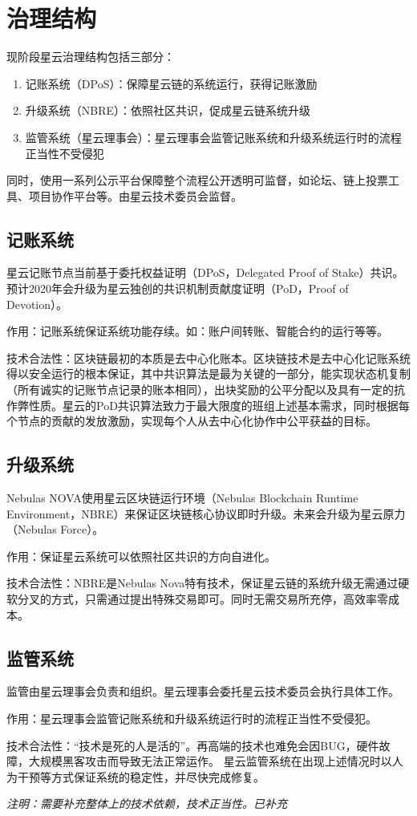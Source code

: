 \section{治理结构}
现阶段星云治理结构包括三部分：
\begin{enumerate}
	\item 记账系统（DPoS）：保障星云链的系统运行，获得记账激励
	\item 升级系统（NBRE）：依照社区共识，促成星云链系统升级
	\item 监管系统（星云理事会）：星云理事会监管记账系统和升级系统运行时的流程正当性不受侵犯
\end{enumerate}
同时，使用一系列公示平台保障整个流程公开透明可监督，如论坛、链上投票工具、项目协作平台等。由星云技术委员会监督。

\subsection{记账系统}
星云记账节点当前基于委托权益证明（DPoS，Delegated Proof of Stake）共识。预计2020年会升级为星云独创的共识机制贡献度证明（PoD，Proof of Devotion）。

作用：记账系统保证系统功能存续。如：账户间转账、智能合约的运行等等。

技术合法性：区块链最初的本质是去中心化账本。区块链技术是去中心化记账系统得以安全运行的根本保证，其中共识算法是最为关键的一部分，能实现状态机复制（所有诚实的记账节点记录的账本相同），出块奖励的公平分配以及具有一定的抗作弊性质。星云的PoD共识算法致力于最大限度的班组上述基本需求，同时根据每个节点的贡献的发放激励，实现每个人从去中心化协作中公平获益的目标。

\subsection{升级系统}
Nebulas NOVA使用星云区块链运行环境（Nebulas Blockchain Runtime Environment，NBRE）来保证区块链核心协议即时升级。未来会升级为星云原力（Nebulas Force）。

作用：保证星云系统可以依照社区共识的方向自进化。

技术合法性：NBRE是Nebulas Nova特有技术，保证星云链的系统升级无需通过硬软分叉的方式，只需通过提出特殊交易即可。同时无需交易所充停，高效率零成本。

\subsection{监管系统}
监管由星云理事会负责和组织。星云理事会委托星云技术委员会执行具体工作。

作用：星云理事会监管记账系统和升级系统运行时的流程正当性不受侵犯。

技术合法性：“技术是死的人是活的”。再高端的技术也难免会因BUG，硬件故障，大规模黑客攻击而导致无法正常运作。	星云监管系统在出现上述情况时以人为干预等方式保证系统的稳定性，并尽快完成修复。

\emph{注明：需要补充整体上的技术依赖，技术正当性。}\emph{已补充}



